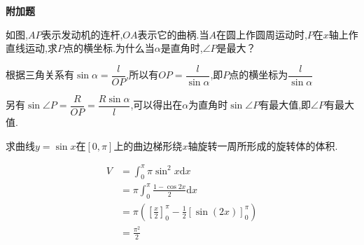 \begin{questions}
	\begin{center}
		\large\bf 附加题
	\end{center}

	\question
	如图,$AP$表示发动机的连杆,$OA$表示它的曲柄.当$A$在圆上作圆周运动时,$P$在$x$轴上作直线运动,求$P$点的横坐标.为什么当$\alpha$是直角时,$\angle{P}$是最大？

	\begin{center}
	\end{center}
	\begin{solution}
		根据三角关系有$\sin\alpha = \dfrac{l}{OP}$,所以有$OP =
			\dfrac{l}{\sin\alpha}$,即$P$点的横坐标为$\dfrac{l}{\sin\alpha}$

		另有$\sin\angle{P} = \dfrac{R}{OP} =
			\dfrac{R\sin\alpha}{l}$,可以得出在$\alpha$为直角时$\sin\angle{P}$有最大值,即$\angle{P}$有最大值.
	\end{solution}
	\question 求曲线$y=\sin{x}$在$[0,\pi]$上的曲边梯形绕$x$轴旋转一周所形成的旋转体的体积.
	\begin{solution}
		\begin{align*}
			V & = \int_0^{\pi}\pi \sin^2{x}\mathrm{d}x                              \\
			  & = \pi\int_0^{\pi}\frac{1-\cos{2x}}{2}\mathrm{d}x                    \\
			  & = \pi(\left[\frac{x}{2}\right]_0^{\pi} - \frac12[\sin(2x)]_0^{\pi}) \\
			  & = \frac{\pi^2}{2}
		\end{align*}
	\end{solution}

\end{questions}
